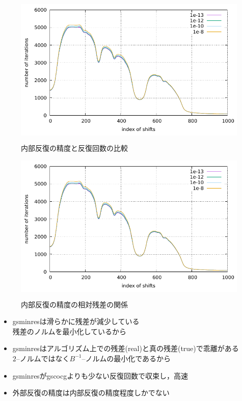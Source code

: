 \begin{figure}[H]
	\begin{center}
		\begin{minipage}[t]{0.49\columnwidth}
			\centering
			\colorbox{white}{ \includegraphics[scale=1.5, page=1]{./fig/compare-inner.pdf} }
			\caption{内部反復の精度と反復回数の比較}
			\label{fig-compare-inner-itr}
		\end{minipage}
		\begin{minipage}[t]{0.49\columnwidth}
			\centering
			\colorbox{white}{ \includegraphics[scale=1.5, page=2]{./fig/compare-inner.pdf} }
			\caption{内部反復の精度の相対残差の関係}
			\label{fig-compare-inner-res}
		\end{minipage}
	\end{center}
\end{figure}

\begin{itemize}
	\item gsminresは滑らかに残差が減少している\\
		\myitem 残差のノルムを最小化しているから
	\item gsminresはアルゴリズム上での残差(real)と真の残差(true)で乖離がある\\
		\myitem $2$--ノルムではなく$B^{-1}$--ノルムの最小化であるから
	\item gsminresがgscocgよりも少ない反復回数で収束し，高速
	\item 外部反復の精度は内部反復の精度程度しかでない
\end{itemize}


